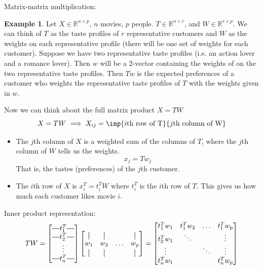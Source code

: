 \documentclass[12pt]{article}
\theoremstyle{definition}
\newtheorem{example}{Example}
\newcommand{\R}{\mathbb{R}}
\newcommand*{\vertbar}{\rule[-1ex]{0.5pt}{2.5ex}}
\newcommand*{\horzbar}{\rule[.5ex]{2.5ex}{0.5pt}}
\begin{document}
Matrix-matrix multiplication:

\begin{example}
Let $X \in \R^{n \times p}$, $n$ movies, $p$ people. $T \in \R^{n \times r}$, and $W \in \R^{r \times p}$. We can think of $T$ as the taste profiles of $r$ representative customers and $W$ as the weights on each representative profile (there will be one set of weights for each customer). Suppose we have two representative taste profiles (i.e. an action lover and a romance lover). Then $w$ will be a $2$-vector containing the weights of on the two representative taste profiles. Then $Tw$ is the expected preferences of a customer who weights the representative taste profiles of $T$ with the weights given in $w$. 
\end{example}

Now we can think about the full matrix product $X = TW$
\begin{equation}
	X = TW \implies X_{ij} = \inp{i\text{th row of T}}{j\text{th column of W}}
\end{equation}

\begin{itemize}
	\item The $j$th column of $X$ is a weighted sum of the columns of $T$, where the $j$th column of $W$ tells us the weights.
	\begin{equation}
		x_j = T w_j 
	\end{equation}
	That is, the tastes (preferences) of the $j$th customer.
	\item The $i$th row of $X$ is $x_i^T = t_i^T W$ where $t_i^T$ is the $i$th row of $T$. This gives us how much each customer likes movie $i$. 
\end{itemize}

Inner product representation:
\begin{equation}
	TW = 
	\begin{bmatrix}
	\horzbar t_1^T \horzbar \\
	\horzbar t_2^T \horzbar \\
	\vdots \\
	\horzbar t_n^T \horzbar	
	\end{bmatrix}
	\begin{bmatrix}
	\vertbar & \vertbar & & \vertbar\\
	w_1 & w_2 & \ldots & w_p \\
	\vertbar & \vertbar & & \vertbar\\	
	\end{bmatrix}
	=
	\begin{bmatrix}
	t_1^Tw_1 & t_1^Tw_2 & \hdots & t_1^Tw_p \\
	t_2^Tw_1 & \ddots & & \vdots\\
	\vdots & & \ddots & \vdots \\
	t_n^Tw_1 & & & t_n^Tw_p
	\end{bmatrix}
\end{equation}
\end{document}
